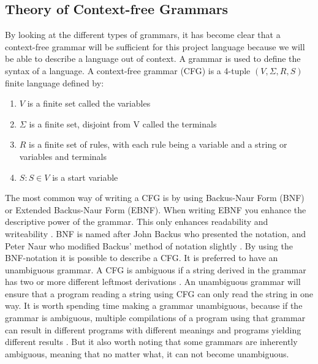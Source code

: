 \subsection{Theory of Context-free Grammars}
\label{sec:grammar}
By looking at the different types of grammars, it has become clear that a context-free grammar will be sufficient for this project language because we will be able to describe a language out of context. A grammar is used to define the syntax of a language. A context-free grammar (CFG) is a 4-tuple $(V, \Sigma, R, S)$ \citep{sipser} finite language defined by:
\begin{enumerate}
	\item $V$ is a finite set called the variables
	\item $\Sigma$ is a finite set, disjoint from V called the terminals
	\item $R$ is a finite set of rules, with each rule being a variable and a string or variables and terminals
	\item $S: S \in V$ is a start variable
\end{enumerate}

The most common way of writing a CFG is by using Backus-Naur Form (BNF) or Extended Backus-Naur Form (EBNF).
When writing EBNF you enhance the descriptive power of the grammar. This only enhances readability and writeability \citep{sebesta}.
BNF is named after John Backus who presented the notation, and Peter Naur who modified Backus' method of notation slightly \citep{sebesta}. By using the BNF-notation it is possible to describe a CFG. It is preferred to have an unambiguous grammar. A CFG is ambiguous if a string derived in the grammar has two or more different leftmost derivations \citep{sipser}. An unambiguous grammar will ensure that a program reading a string using CFG can only read the string in one way.
It is worth spending time making a grammar unambiguous, because if the grammar is ambiguous, multiple compilations of a program using that grammar can result in different programs with different meanings and programs yielding different results \citep{sebesta}. But it also worth noting that some grammars are inherently ambiguous, meaning that no matter what, it can not become unambiguous.

